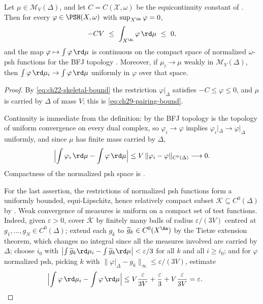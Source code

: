 \begin{proposition}
\label{prop:ch29-skeletal-pairing}
Let \(\mu\in\mathcal M_V(\Delta)\), and let \(C=C(\mathcal X,\omega)\) be
the equicontinuity constant of .  Then
for every \(\varphi\in\PSH(X,\omega)\) with \(\sup_{X^{\An}}\varphi=0\),
\begin{equation}
\label{eq:ch29-pairing-bound}
 -CV\ \leq\ \int_{X^{\An}}\varphi\,\rd\mu\ \leq\ 0 ,
\end{equation}
and the map
\(\varphi\mapsto\int\varphi\,\rd\mu\) is continuous on the compact space of
normalized \(\omega\)-psh functions for the BFJ topology
.  Moreover, if \(\mu_i\to\mu\) weakly in
\(\mathcal M_V(\Delta)\), then
\(\int\varphi\,\rd\mu_i\to\int\varphi\,\rd\mu\) uniformly in \(\varphi\)
over that space.
\end{proposition}

\begin{proof}
By \eqref{eq:ch22-skeletal-bound} the restriction \(\varphi|_\Delta\)
satisfies \(-C\leq\varphi\leq0\), and \(\mu\) is carried by \(\Delta\) of
mass \(V\); this is \eqref{eq:ch29-pairing-bound}.

Continuity is immediate from the definition: by
 the BFJ topology is the topology of uniform
convergence on every dual complex, so \(\varphi_i\to\varphi\) implies
\(\varphi_i|_\Delta\to\varphi|_\Delta\) uniformly, and since \(\mu\) has
finite mass carried by \(\Delta\),
\[
 \Bigl|\int\varphi_i\,\rd\mu-\int\varphi\,\rd\mu\Bigr|
 \leq V\,\lVert\varphi_i-\varphi\rVert_{C^0(\Delta)}
 \longrightarrow0 .
\]
Compactness of the normalized psh space is
.

For the last assertion, the restrictions of normalized psh functions form a
uniformly bounded, equi-Lipschitz, hence relatively compact subset
\(\mathcal K\subseteq C^0(\Delta)\) by
.  Weak convergence of measures is uniform on
a compact set of test functions.  Indeed, given \(\varepsilon>0\), cover
\(\overline{\mathcal K}\) by finitely many balls of radius
\(\varepsilon/(3V)\) centred at \(g_1,\dots,g_N\in C^0(\Delta)\); extend
each \(g_k\) to \(\widetilde g_k\in C^0(X^{\An})\) by the Tietze extension
theorem, which changes no integral since all the measures involved are
carried by \(\Delta\); choose \(i_0\) with
\(\bigl|\int\widetilde g_k\rd\mu_i-\int\widetilde g_k\rd\mu\bigr|
<\varepsilon/3\) for all \(k\) and all \(i\geq i_0\); and for
\(\varphi\) normalized psh, picking \(k\) with
\(\lVert\varphi|_\Delta-g_k\rVert_\infty\leq\varepsilon/(3V)\), estimate
\[
 \Bigl|\int\varphi\,\rd\mu_i-\int\varphi\,\rd\mu\Bigr|
 \leq V\frac{\varepsilon}{3V}+\frac\varepsilon3+V\frac{\varepsilon}{3V}
 =\varepsilon .\qquad
\]
\end{proof}

